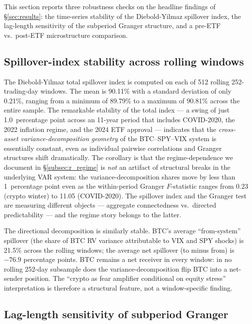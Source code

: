 \documentclass[11pt,a4paper]{article}
\begin{document}
This section reports three robustness checks on the headline findings of \S\ref{sec:results}: the time-series stability of the Diebold-Yilmaz spillover index, the lag-length sensitivity of the subperiod Granger structure, and a pre-ETF vs.\ post-ETF microstructure comparison.

\subsection{Spillover-index stability across rolling windows}
\label{subsec:r_spillover}

The Diebold-Yilmaz total spillover index is computed on each of 512 rolling 252-trading-day windows. The mean is 90.11\% with a standard deviation of only 0.21\%, ranging from a minimum of 89.79\% to a maximum of 90.81\% across the entire sample.%
 The remarkable stability of the total index --- a swing of just 1.0~percentage point across an 11-year period that includes COVID-2020, the 2022 inflation regime, and the 2024 ETF approval --- indicates that the \emph{cross-asset variance-decomposition geometry} of the BTC--SPY--VIX system is essentially constant, even as individual pairwise correlations and Granger structures shift dramatically. The corollary is that the regime-dependence we document in \S\ref{subsec:r_regime} is \emph{not} an artifact of structural breaks in the underlying VAR system: the variance-decomposition shares move by less than 1~percentage point even as the within-period Granger $F$-statistic ranges from 0.23 (crypto winter) to 11.05 (COVID-2020). The spillover index and the Granger test are measuring different objects --- aggregate connectedness vs.\ directed predictability --- and the regime story belongs to the latter.

The directional decomposition is similarly stable. BTC's average ``from-system'' spillover (the share of BTC RV variance attributable to VIX and SPY shocks) is 21.5\% across the rolling windows; the average net spillover (to minus from) is $-76.9$ percentage points. BTC remains a net receiver in every window: in no rolling 252-day subsample does the variance-decomposition flip BTC into a net-sender position. The ``crypto as fear amplifier conditional on equity stress'' interpretation is therefore a structural feature, not a window-specific finding.

\subsection{Lag-length sensitivity of subperiod Granger}
\label{subsec:r_lagsens}
\end{document}

